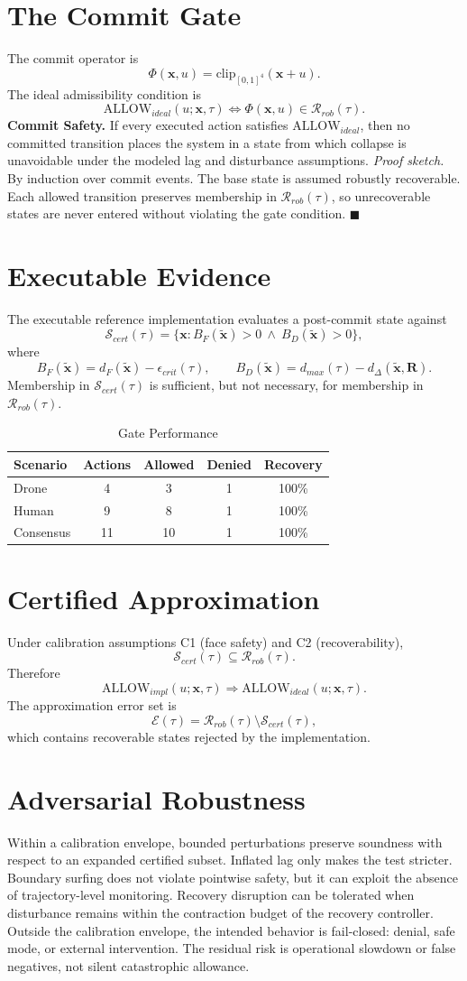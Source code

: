 \documentclass[letterpaper,10pt,conference]{ieeeconf}
\newcommand{\x}{\mathbf{x}}
\newcommand{\xt}{\tilde{\mathbf{x}}}
\newcommand{\Rrob}{\mathcal{R}_{rob}}
\newcommand{\Scert}{\mathcal{S}_{cert}}
\newcommand{\Phiop}{\Phi}
\newcommand{\Rigel}{\mathbf{R}}
\begin{document}
\section{The Commit Gate}
The commit operator is
\[
\Phiop(\x,u)=\mathrm{clip}_{[0,1]^4}(\x+u).
\]
The ideal admissibility condition is
\[
\mathrm{ALLOW}_{ideal}(u;\x,\tau)\iff \Phiop(\x,u)\in\Rrob(\tau).
\]
\textbf{Commit Safety.} If every executed action satisfies $\mathrm{ALLOW}_{ideal}$, then no committed transition places the system in a state from which collapse is unavoidable under the modeled lag and disturbance assumptions.
\textit{Proof sketch.} By induction over commit events. The base state is assumed robustly recoverable. Each allowed transition preserves membership in $\Rrob(\tau)$, so unrecoverable states are never entered without violating the gate condition. \hfill $\blacksquare$
\section{Executable Evidence}
The executable reference implementation evaluates a post-commit state against
\[
\Scert(\tau)=\{\x: B_F(\xt)>0\ \wedge\ B_D(\xt)>0\},
\]
where
\[
B_F(\xt)=d_F(\xt)-\epsilon_{crit}(\tau),\qquad
B_D(\xt)=d_{max}(\tau)-d_\Delta(\xt,\Rigel).
\]
Membership in $\Scert(\tau)$ is sufficient, but not necessary, for membership in $\Rrob(\tau)$.
\begin{table}[h]
\centering
\caption{Gate Performance}
\begin{tabular}{lcccc}
\toprule
Scenario & Actions & Allowed & Denied & Recovery \\
\midrule
Drone & 4 & 3 & 1 & 100\% \\
Human & 9 & 8 & 1 & 100\% \\
Consensus & 11 & 10 & 1 & 100\% \\
\bottomrule
\end{tabular}
\end{table}
\section{Certified Approximation}
Under calibration assumptions C1 (face safety) and C2 (recoverability),
\[
\Scert(\tau)\subseteq\Rrob(\tau).
\]
Therefore
\[
\mathrm{ALLOW}_{impl}(u;\x,\tau)\Rightarrow \mathrm{ALLOW}_{ideal}(u;\x,\tau).
\]
The approximation error set is
\[
\mathcal{E}(\tau)=\Rrob(\tau)\setminus\Scert(\tau),
\]
which contains recoverable states rejected by the implementation.
\section{Adversarial Robustness}
Within a calibration envelope, bounded perturbations preserve soundness with respect to an expanded certified subset. Inflated lag only makes the test stricter. Boundary surfing does not violate pointwise safety, but it can exploit the absence of trajectory-level monitoring. Recovery disruption can be tolerated when disturbance remains within the contraction budget of the recovery controller.
Outside the calibration envelope, the intended behavior is fail-closed: denial, safe mode, or external intervention. The residual risk is operational slowdown or false negatives, not silent catastrophic allowance.
\end{document}
